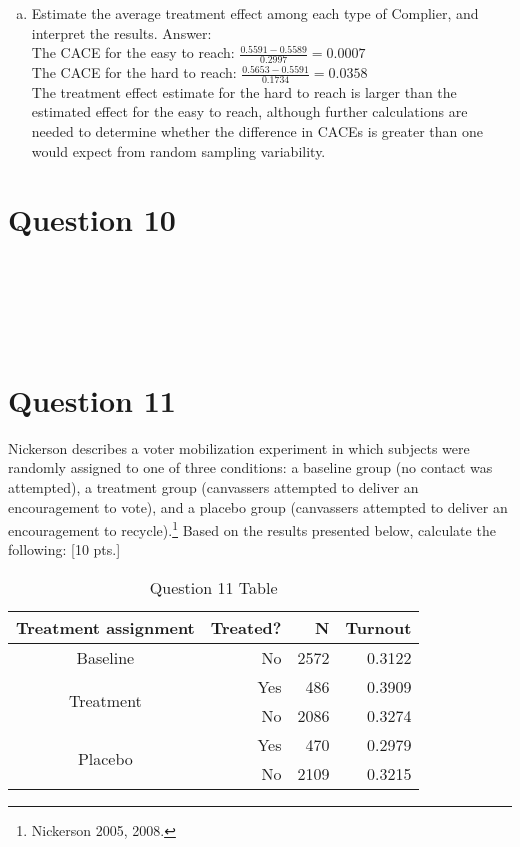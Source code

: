 \documentclass[11pt,notitlepage]{article}\usepackage[]{graphicx}\usepackage[]{color}
\makeatletter
\newenvironment{kframe}{%
 \def\at@end@of@kframe{}%
 \ifinner\ifhmode%
  \def\at@end@of@kframe{\end{minipage}}%
  \begin{minipage}{\columnwidth}%
 \fi\fi%
 \def\FrameCommand##1{\hskip\@totalleftmargin \hskip-\fboxsep
 \colorbox{shadecolor}{##1}\hskip-\fboxsep
     \hskip-\linewidth \hskip-\@totalleftmargin \hskip\columnwidth}%
 \MakeFramed {\advance\hsize-\width
   \@totalleftmargin\z@ \linewidth\hsize
   \@setminipage}}%
 {\par\unskip\endMakeFramed%
 \at@end@of@kframe}
\newenvironment{knitrout}{}{} %
\makeatother
\begin{document}
\begin{enumerate}[a)]
\item Estimate the average treatment effect among each type of Complier, and interpret the results.
Answer:\\
The CACE for the easy to reach: $\frac{0.5591 - 0.5589}{0.2997} = 0.0007$ \\ 
The CACE for the hard to reach: $\frac{0.5653 - 0.5591}{0.1734} = 0.0358$ \\
The treatment effect estimate for the hard to reach is larger than the estimated effect for the easy to reach, although further calculations are needed to determine whether the difference in CACEs is greater than one would expect from random sampling variability.

\end{enumerate}

\section*{Question 10}
\begin{knitrout}
\color{fgcolor}\begin{kframe}
\begin{verbatim}






\end{verbatim}
\end{kframe}
\end{knitrout}

\section*{Question 11}
Nickerson describes a voter mobilization experiment in which subjects were randomly assigned to one of three conditions: a baseline group (no contact was attempted), a treatment group (canvassers attempted to deliver an encouragement to vote), and a placebo group (canvassers attempted to deliver an encouragement to recycle).\footnote{Nickerson 2005, 2008.} Based on the results presented below, calculate the following: [10 pts.]
\begin{table}[H]
  \centering
  \caption{Question 11 Table}
    \begin{tabular}{rrrr}
    \toprule
    Treatment assignment  & Treated?  & N     & Turnout  \\
    \midrule
    \multicolumn{1}{c}{Baseline}  & No    & 2572  & 0.3122 \\
    \multicolumn{1}{c}{\multirow{2}[0]{*}{Treatment }} & Yes   & 486   & 0.3909 \\
    \multicolumn{1}{c}{} & No    & 2086  & 0.3274 \\
    \multicolumn{1}{c}{\multirow{2}[0]{*}{Placebo }} & Yes   & 470   & 0.2979 \\
    \multicolumn{1}{c}{} & No    & 2109  & 0.3215 \\
    \bottomrule
    \end{tabular}%
  \label{tab:addlabel}%
\end{table}%
\end{document}
